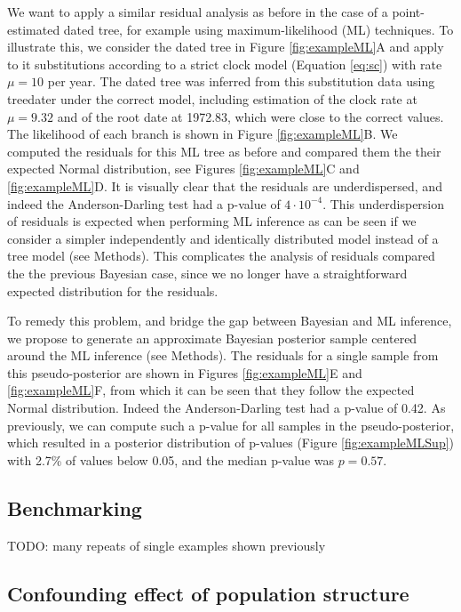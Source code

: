 \documentclass{article}
\begin{document}
We want to apply a similar residual analysis as before in the case of a point-estimated dated tree,
for example using maximum-likelihood (ML) techniques. To illustrate this, we consider the dated
tree in Figure \ref{fig:exampleML}A and apply to it substitutions according to a strict clock model
(Equation \ref{eq:sc}) with rate $\mu=10$ per year. The dated tree was inferred from this substitution data
using treedater \citep{Volz2017} under the correct model, including estimation of the clock rate at 
$\mu=9.32$ and of the root date at 1972.83, which were close to the correct values.
The likelihood of each branch is shown in Figure \ref{fig:exampleML}B.
We computed the residuals for this ML tree as before and compared them the their expected
Normal distribution, see Figures \ref{fig:exampleML}C and \ref{fig:exampleML}D.
It is visually clear that the residuals are underdispersed, and indeed the Anderson-Darling test 
had a p-value of $4\cdot10^{-4}$. This underdispersion of residuals is expected when performing 
ML inference as can be seen if we consider a simpler independently and identically 
distributed model instead of a tree model (see Methods). This complicates the analysis of residuals
compared the the previous Bayesian case, since we no longer have a straightforward expected 
distribution for the residuals. 

To remedy this problem, and bridge the gap between Bayesian and 
ML inference, we propose to generate an approximate Bayesian posterior sample centered
around the ML inference (see Methods). The residuals for a single sample from this pseudo-posterior
are shown in Figures \ref{fig:exampleML}E and \ref{fig:exampleML}F, from which it can be seen
that they follow the expected Normal distribution. Indeed the Anderson-Darling test had a p-value
of 0.42. As previously, we can compute such a p-value for all samples in the pseudo-posterior,
which resulted in a posterior distribution of p-values (Figure \ref{fig:exampleMLSup}) with 2.7\% of 
values below 0.05, and the median p-value was $p=0.57$.

\subsection*{Benchmarking}

TODO: many repeats of single examples shown previously

\subsection*{Confounding effect of population structure} 
\end{document}
